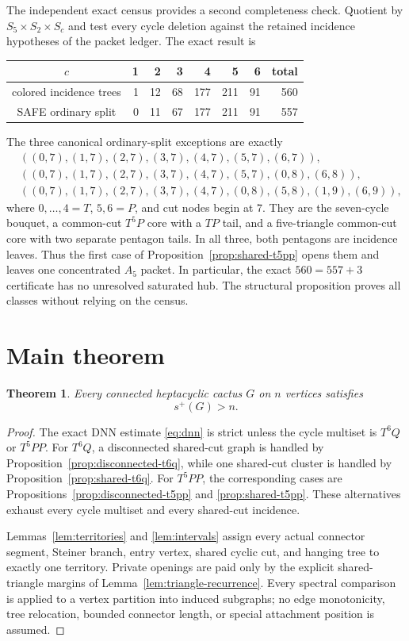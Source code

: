 \documentclass[11pt]{article}
\newtheorem{theorem}{Theorem}[section]
\newcommand{\spE}{s^+}
\begin{document}
The independent exact census provides a second completeness check.  Quotient
by $S_5\times S_2\times S_c$ and test every cycle deletion against the retained
incidence hypotheses of the packet ledger.  The exact result is
\begin{center}
\begin{tabular}{c|rrrrrr|r}
$c$&1&2&3&4&5&6&total\\ \hline
colored incidence trees&1&12&68&177&211&91&560\\
SAFE ordinary split&0&11&67&177&211&91&557
\end{tabular}
\end{center}
The three canonical ordinary-split exceptions are exactly
\begin{align}
 &((0,7),(1,7),(2,7),(3,7),(4,7),(5,7),(6,7)),
 \label{eq:u1}\\
 &((0,7),(1,7),(2,7),(3,7),(4,7),(5,7),(0,8),(6,8)),
 \label{eq:u2}\\
 &((0,7),(1,7),(2,7),(3,7),(4,7),(0,8),(5,8),(1,9),(6,9)),
 \label{eq:u3}
\end{align}
where $0,\ldots,4=T$, $5,6=P$, and cut nodes begin at $7$.  They are the
seven-cycle bouquet, a common-cut $T^5P$ core with a $TP$ tail, and a
five-triangle common-cut core with two separate pentagon tails.  In all three,
both pentagons are incidence leaves.  Thus the first case of
Proposition~\ref{prop:shared-t5pp} opens them and leaves one concentrated
$A_5$ packet.  In particular, the exact $560=557+3$ certificate has no
unresolved saturated hub.  The structural proposition proves all classes
without relying on the census.

\section{Main theorem}

\begin{theorem}\label{thm:main}
Every connected heptacyclic cactus $G$ on $n$ vertices satisfies
\[
 \boxed{\spE(G)>n}.
\]
\end{theorem}

\begin{proof}
The exact DNN estimate \eqref{eq:dnn} is strict unless the cycle multiset is
$T^6Q$ or $T^5PP$.  For $T^6Q$, a disconnected shared-cut graph is handled by
Proposition~\ref{prop:disconnected-t6q}, while one shared-cut cluster is handled
by Proposition~\ref{prop:shared-t6q}.  For $T^5PP$, the corresponding cases are
Propositions~\ref{prop:disconnected-t5pp} and
\ref{prop:shared-t5pp}.  These alternatives exhaust every cycle multiset and
every shared-cut incidence.

Lemmas~\ref{lem:territories} and \ref{lem:intervals} assign every actual
connector segment, Steiner branch, entry vertex, shared cyclic cut, and hanging
tree to exactly one territory.  Private openings are paid only by the explicit
shared-triangle margins of Lemma~\ref{lem:triangle-recurrence}.  Every spectral
comparison is applied to a vertex partition into induced subgraphs; no edge
monotonicity, tree relocation, bounded connector length, or special attachment
position is assumed.
\end{proof}
\end{document}
